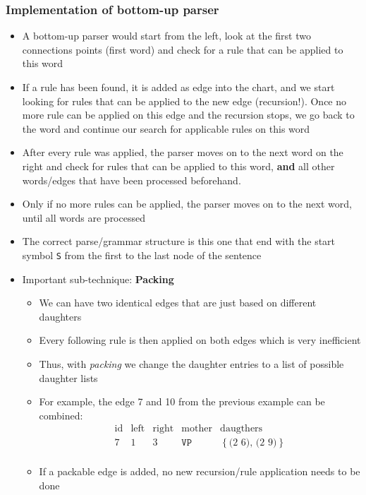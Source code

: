 \subsubsection{Implementation of bottom-up parser}
\begin{itemize}
	\item A bottom-up parser would start from the left, look at the first two connections points (first word) and check for a rule that can be applied to this word
	\item If a rule has been found, it is added as edge into the chart, and we start looking for rules that can be applied to the new edge (recursion!). Once no more rule can be applied on this edge and the recursion stops, we go back to the word and continue our search for applicable rules on this word 
	\item After every rule was applied, the parser moves on to the next word on the right and check for rules that can be applied to this word, \textbf{and} all other words/edges that have been processed beforehand. 
	\item Only if no more rules can be applied, the parser moves on to the next word, until all words are processed
	\item The correct parse/grammar structure is this one that end with the start symbol \texttt{S} from the first to the last node of the sentence
	\item Important sub-technique: \textbf{Packing}
	\begin{itemize}
		\item We can have two identical edges that are just based on different daughters
		\item Every following rule is then applied on both edges which is very inefficient
		\item Thus, with \textit{packing} we change the daughter entries to a list of possible daughter lists 
		\item For example, the edge 7 and 10 from the previous example can be combined:
		$$\begin{array}{ccccc}
		\text{id} & \text{left} & \text{right} & \text{mother} & \text{daugthers}\\
		\hline
		7 & 1 & 3 & \texttt{VP} & \left\{\text{(2 6), (2 9)}\right\}\\
		\end{array}$$
		\item If a packable edge is added, no new recursion/rule application needs to be done  
	\end{itemize}
\end{itemize}
